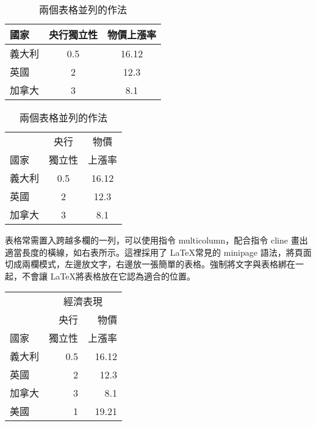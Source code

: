 \begin{table}[h]
    \centering
    \caption{兩個表格並列的作法}\label{tb:basic_two_table}
    \renewcommand{\arraystretch}{1.8}
    \colorbox{beaublue}{\begin{tabular}{lcc}
    \hline
    國家		& 央行獨立性	& 物價上漲率 \\\hline
    義大利   	& 0.5       	& 16.12 \\
    英國    	& 2         	& 12.3 \\
    加拿大   	& 3         	& 8.1 \\\hline
    \end{tabular}}\hspace{10pt}
    \begin{tabular}{lcc}
    \hline \rowcolor{beige}
           	& 央行	& 物價 \\[-2pt]\rowcolor{beige}
    國家    	& 獨立性 	& 上漲率 \\\hline
    義大利  	& 0.5   	& 16.12 \\
    英國    	& 2     	& 12.3 \\
    加拿大   	& 3     	& 8.1 \\\hline
    \end{tabular}
\end{table}

\begin{minipage}{.45\linewidth}
\bigskip 
表格常需置入跨越多欄的一列，可以使用指令 {\A multicolumn}，配合指令 {\A cline} 畫出適當長度的橫線，如右表所示。這裡採用了 \LaTeX 常見的 {\A minipage} 語法，將頁面切成兩欄模式，左邊放文字，右邊放一張簡單的表格。強制將文字與表格綁在一起，不會讓 \LaTeX 將表格放在它認為適合的位置。
\end{minipage}\hfill
\begin{minipage}{.55\linewidth}

    \centering
    \begin{tabular}{lrr}
    \hline
         	& \multicolumn{2}{c}{經濟表現}\\\cline{2-3}%
            	& 央行  	& 物價 \\[-2pt]
    國家    	& 獨立性 	& 上漲率 	\\\hline\rowcolor{beige}
    義大利 	& 0.5   	& 16.12 	\\\rowcolor{bisque}
    英國    	& 2     	& 12.3 	\\\rowcolor{beige}
    加拿大 	& 3     	& 8.1 	\\\rowcolor{bisque}
    美國    & 1     	& 19.21 	\\\hline
    \end{tabular}
\end{minipage}  

